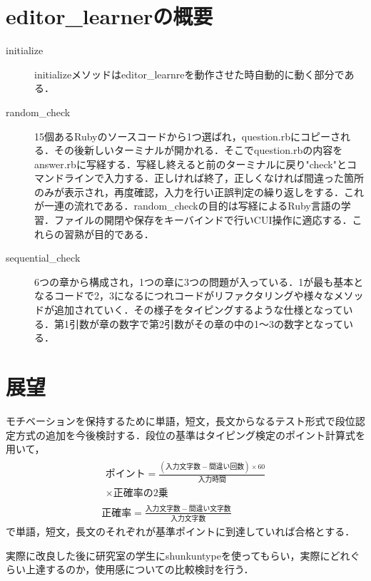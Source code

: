 \documentclass[a4j,twocolumn]{jsarticle}
\begin{document}
\section{editor\_learnerの概要}
\begin{description}
\item[initialize]
initializeメソッドはeditor_learnreを動作させた時自動的に動く部分である．
\item[random\_check] 
15個あるRubyのソースコードから1つ選ばれ，question.rbにコピーされる．その後新しいターミナルが開かれる．そこでquestion.rbの内容をanswer.rbに写経する．写経し終えると前のターミナルに戻り"check"とコマンドラインで入力する．正しければ終了，正しくなければ間違った箇所のみが表示され，再度確認，入力を行い正誤判定の繰り返しをする．これが一連の流れである．random\_checkの目的は写経によるRuby言語の学習．ファイルの開閉や保存をキーバインドで行いCUI操作に適応する．これらの習熟が目的である．
\item[sequential\_check]
6つの章から構成され，1つの章に3つの問題が入っている．1が最も基本となるコードで2，3になるにつれコードがリファクタリングや様々なメソッドが追加されていく．その様子をタイピングするような仕様となっている．第1引数が章の数字で第2引数がその章の中の1〜3の数字となっている．
\end{description}

\section{展望}
モチベーションを保持するために単語，短文，長文からなるテスト形式で段位認定方式の追加を今後検討する．段位の基準はタイピング検定のポイント計算式を用いて，
\begin{gather*}
\begin{split}
ポイント=\frac{(入力文字数-間違い回数) \times 60}{入力時間} \\
 \times 正確率の2乗
\end{split} \\
正確率 = \frac{入力文字数-間違い文字数}{入力文字数}
\end{gather*}
で単語，短文，長文のそれぞれが基準ポイントに到達していれば合格とする\cite{e-typing}．


実際に改良した後に研究室の学生にshunkuntypeを使ってもらい，実際にどれぐらい上達するのか，使用感についての比較検討を行う．

\vspace{0.3\baselineskip}
\end{document}

